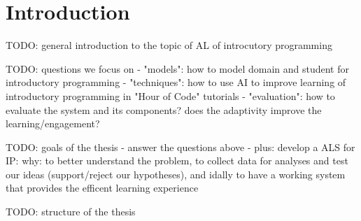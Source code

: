 \chapter{Introduction}
\label{chap:introduction}

TODO: general introduction to the topic of AL of introcutory programming

TODO: questions we focus on
- "models": how to model domain and student for introductory programming
- "techniques": how to use AI to improve learning of introductory programming
  in "Hour of Code" tutorials
- "evaluation": how to evaluate the system and its components?
  does the adaptivity improve the learning/engagement?

TODO: goals of the thesis
- answer the questions above
- plus: develop a ALS for IP: why: to better understand the problem,
  to collect data for analyses and test our ideas (support/reject our hypotheses),
  and idally to have a working system that provides the efficent learning experience


TODO: structure of the thesis
